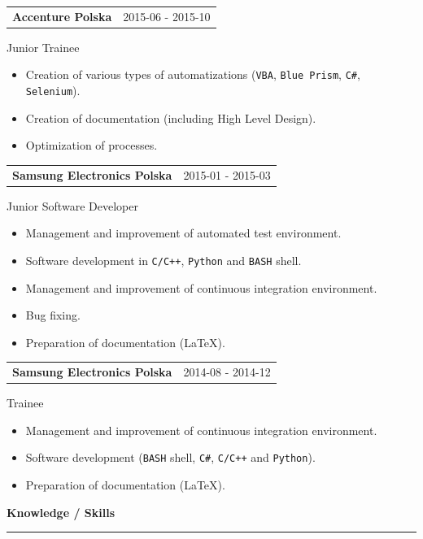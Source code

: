 \documentclass{article}
\begin{document}
\begin{tabular}{@{} m{} R{0.37\textwidth} }
\textbf{Accenture Polska}	& {2015-06 - 2015-10}
\end{tabular}
Junior Trainee\\
\begin{itemize}
	\item Creation of various types of automatizations (\texttt{VBA}, \texttt{Blue Prism}, \texttt{C\#}, \texttt{Selenium}).
	\item Creation of documentation (including High Level Design).
	\item Optimization of processes.
\end{itemize}

\begin{tabular}{@{} m{} R{0.37\textwidth} }
\textbf{Samsung Electronics Polska}	& {2015-01 - 2015-03}
\end{tabular}
Junior Software Developer\\
\begin{itemize}
	\item Management and improvement of automated test environment.
	\item Software development in \texttt{C/C++}, \texttt{Python} and \texttt{BASH} shell.
	\item Management and improvement of continuous integration environment.
	\item Bug fixing.
	\item Preparation of documentation (\LaTeX).
\end{itemize}

\begin{tabular}{@{} m{} R{0.37\textwidth} }
	\textbf{Samsung Electronics Polska}	& {2014-08 - 2014-12}
\end{tabular}
Trainee\\
\begin{itemize}
	\item Management and improvement of continuous integration environment.
	\item Software development (\texttt{BASH} shell, \texttt{C\#}, \texttt{C/C++} and \texttt{Python}).
	\item Preparation of documentation (\LaTeX).
\end{itemize}

\textbf{\large Knowledge / Skills}
\vspace{0.005\textheight}
\hrule
\end{document}
